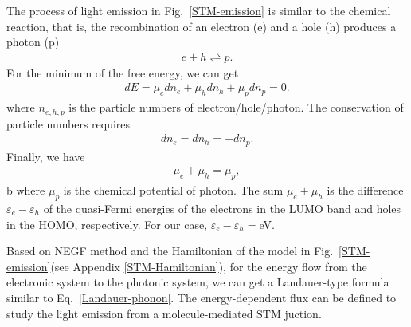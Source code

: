 \documentclass[aps,prb,
,floatfix,footinbib,shortbibliography,
preprint
]{revtex4-1}
\begin{document}
The process of light emission in Fig.~\ref{STM-emission} is similar to the chemical reaction, that is, the recombination of an electron (e) and a hole (h) produces a photon (p)
\begin{equation}
\begin{split}
e+h\rightleftharpoons p.
\end{split}
\end{equation}
For the minimum of the free energy, we can get
\begin{equation}
\begin{split}
dE=\mu_{e}dn_{e}+\mu_{h}dn_{h}+\mu_{p}dn_{p}=0.
\end{split}
\end{equation}
where $n_{e,h,p}$ is the particle numbers of electron/hole/photon.
The conservation of particle numbers requires 
\begin{equation}
\begin{split}
dn_{e}=dn_{h}=-dn_{p}.
\end{split}
\end{equation}
Finally, we have
\begin{equation}
\begin{split}
\mu_{e}+\mu_{h}=\mu_{p},
\end{split}
\end{equation}b
where $\mu_{p}$ is the chemical potential of photon. The sum $\mu_{e}+\mu_{h}$ is the difference $\varepsilon_{e}-\varepsilon_{h}$ of the quasi-Fermi energies of the electrons in the LUMO band and
holes in the HOMO, respectively\cite{wurfel1982chemical}. For our case, $\varepsilon_{e}-\varepsilon_{h}=$eV. 

Based on NEGF method and the Hamiltonian of the model in Fig.~\ref{STM-emission}(see Appendix \ref{STM-Hamiltonian}), for the energy flow from the electronic system to the photonic system, we can get a Landauer-type formula similar to Eq.~\ref{Landauer-phonon}. The energy-dependent flux can be defined to study the light emission from a molecule-mediated STM juction\cite{nian2018fano}.

\end{document}
